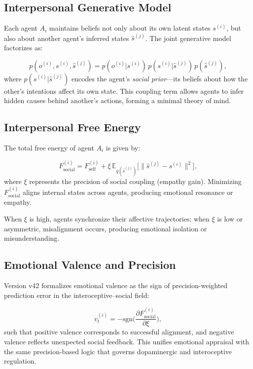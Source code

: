 \documentclass[9pt]{elife}
\begin{document}
\subsection{Interpersonal Generative Model}

Each agent $A_i$ maintains beliefs not only about its own latent states
$s^{(i)}$, but also about another agent’s inferred states $\hat{s}^{(j)}$.
The joint generative model factorizes as:

\[
p(o^{(i)}, s^{(i)}, \hat{s}^{(j)}) =
p(o^{(i)}|s^{(i)}) \,
p(s^{(i)}|\hat{s}^{(j)}) \,
p(\hat{s}^{(j)}),
\]
where $p(s^{(i)}|\hat{s}^{(j)})$ encodes
the agent’s \emph{social prior}—its beliefs about
how the other’s intentions affect its own state.
This coupling term allows agents to infer hidden causes behind
another’s actions, forming a minimal theory of mind.

\subsection{Interpersonal Free Energy}

The total free energy of agent $A_i$ is given by:

\[
F^{(i)}_{\mathrm{social}} =
F^{(i)}_{\mathrm{self}}
+ \xi \, \mathbb{E}_{q(\hat{s}^{(j)})}
\big[\| \hat{s}^{(j)} - s^{(i)} \|^2\big],
\]
where $\xi$ represents the precision of social coupling
(empathy gain).
Minimizing $F^{(i)}_{\mathrm{social}}$
aligns internal states across agents,
producing emotional resonance or empathy.

When $\xi$ is high, agents synchronize their affective trajectories;
when $\xi$ is low or asymmetric, misalignment occurs,
producing emotional isolation or misunderstanding.

\subsection{Emotional Valence and Precision}

Version v42 formalizes emotional valence as the sign of precision-weighted
prediction error in the interoceptive–social field:

\[
v^{(i)}_t = - \text{sgn}\!\big( \frac{\partial F^{(i)}_{\mathrm{social}}}{\partial \xi} \big),
\]
such that positive valence corresponds to successful alignment,
and negative valence reflects unexpected social feedback.
This unifies emotional appraisal with the same precision-based logic
that governs dopaminergic and interoceptive regulation.
\end{document}
